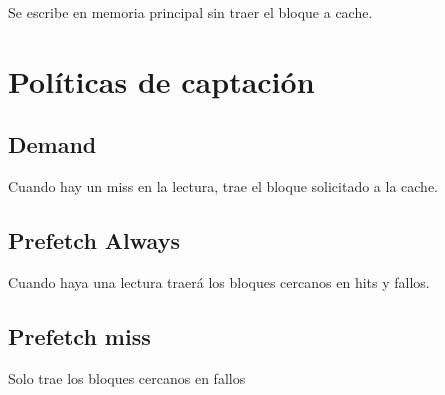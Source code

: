 \documentclass{article}
\begin{document}
\begin{multicols}{2}
		Se escribe en memoria principal sin traer el bloque a cache.
		
		\section{Políticas de captación}
		
		\subsection{Demand}
		
		Cuando hay un miss en la lectura, trae el bloque solicitado a la cache.
		
		\subsection{Prefetch Always}
		
		Cuando haya una lectura traerá los bloques cercanos en hits y fallos.
		
		\subsection{Prefetch miss}
		
		Solo trae los bloques cercanos en fallos
	\end{multicols}
	
\end{document}
